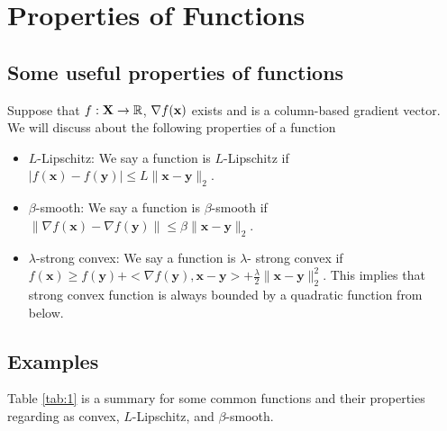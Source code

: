 \documentclass[12pt]{report}
\def\bx{\bm{x}}
\def\by{\bm{y}}
\def\bbR{\mathbb R}
\begin{document}

\maketitle






\section{Properties of Functions}

\subsection{Some useful properties of functions}
Suppose that $f:\bf X\to \bbR$, $\nabla f(\bf x)$  exists and is a column-based gradient vector. We will discuss about the following properties of a function

\begin{itemize}
 \item $L$-Lipschitz: We say a function is $L$-Lipschitz if $|f(\bx)-f(\by)|\leq L \|\bx-\by \|_2$.
 \item $\beta$-smooth: We say a function is $\beta$-smooth if $\|\nabla f(\bx)-\nabla f(\by)\|\leq \beta\|\bx-\by\|_2$.
 \item $\lambda$-strong convex: We say a function is $\lambda$- strong convex if $f(\bx)\geq f(\by)+<\nabla f(\by), \bx-\by>+\frac{\lambda}{2}\|\bx-\by\|_2^2$. This implies that strong convex function is always bounded by a quadratic function from below.
\end{itemize}


\subsection{Examples}

Table \ref{tab:1} is a summary for some common functions and their properties regarding as convex, $L$-Lipschitz, and $\beta$-smooth.
\end{document}

